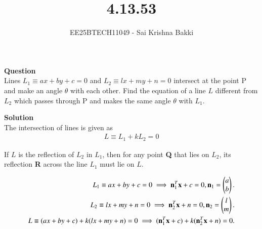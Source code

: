 \documentclass[journal]{IEEEtran}
\begin{document}

\title{4.13.53}
\author{EE25BTECH11049 - Sai Krishna Bakki}
\maketitle
\vspace{-3em}
\textbf{Question}\\
Lines $L_1 \equiv ax + by + c = 0$ and $L_2 \equiv lx + my + n = 0$ intersect at the point P and make an angle $\theta$ with each other. Find the equation of a line $L$ different from $L_2$ which passes through P and makes the same angle $\theta$ with $L_1$.

\textbf{Solution}\\
The intersection of lines is given as
\begin{align}
L \equiv L_1 + k L_2 = 0
\end{align}

If $L$ is the reflection of $L_2$ in $L_1$, then for any point \textbf{Q} that lies on $L_2$, its reflection \textbf{R} across the line $L_1$ must lie on $L$.

\begin{align}
 L_1 \equiv ax + by + c = 0 \implies \mathbf{n}_1^T \mathbf{x} + c = 0, \mathbf{n}_1 = \begin{pmatrix} a \\ b\end{pmatrix}.\\
L_2 \equiv lx + my + n = 0 \implies \mathbf{n}_2^T \mathbf{x} + n = 0, \mathbf{n}_2 = \begin{pmatrix} l \\ m\end{pmatrix}. \\
L \equiv (ax+by+c) + k(lx+my+n) = 0 \implies (\mathbf{n}_1^T \mathbf{x} + c) + k(\mathbf{n}_2^T \mathbf{x} + n) = 0.
\end{align}
\end{document}
